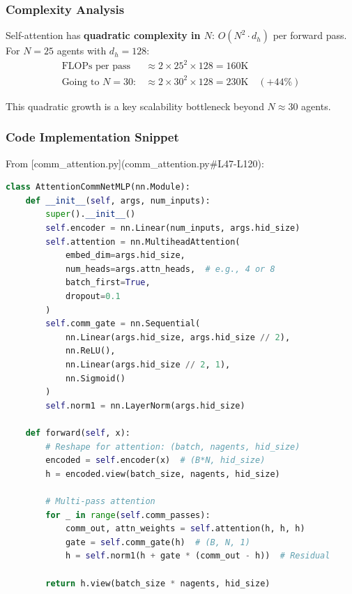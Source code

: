 \subsubsection{Complexity Analysis}

Self-attention has \textbf{quadratic complexity in $N$}: $O(N^2 \cdot d_h)$ per forward pass. For $N=25$ agents with $d_h=128$:
\begin{align*}
\text{FLOPs per pass} &\approx 2 \times 25^2 \times 128 = 160\text{K} \\
\text{Going to } N=30: &\approx 2 \times 30^2 \times 128 = 230\text{K} \quad (+44\%)
\end{align*}

This quadratic growth is a key scalability bottleneck beyond $N \approx 30$ agents.

\subsubsection{Code Implementation Snippet}

From [comm\_attention.py](comm_attention.py#L47-L120):

\begin{lstlisting}[language=Python, basicstyle=\small]
class AttentionCommNetMLP(nn.Module):
    def __init__(self, args, num_inputs):
        super().__init__()
        self.encoder = nn.Linear(num_inputs, args.hid_size)
        self.attention = nn.MultiheadAttention(
            embed_dim=args.hid_size,
            num_heads=args.attn_heads,  # e.g., 4 or 8
            batch_first=True,
            dropout=0.1
        )
        self.comm_gate = nn.Sequential(
            nn.Linear(args.hid_size, args.hid_size // 2),
            nn.ReLU(),
            nn.Linear(args.hid_size // 2, 1),
            nn.Sigmoid()
        )
        self.norm1 = nn.LayerNorm(args.hid_size)
    
    def forward(self, x):
        # Reshape for attention: (batch, nagents, hid_size)
        encoded = self.encoder(x)  # (B*N, hid_size)
        h = encoded.view(batch_size, nagents, hid_size)
        
        # Multi-pass attention
        for _ in range(self.comm_passes):
            comm_out, attn_weights = self.attention(h, h, h)
            gate = self.comm_gate(h)  # (B, N, 1)
            h = self.norm1(h + gate * (comm_out - h))  # Residual
        
        return h.view(batch_size * nagents, hid_size)
\end{lstlisting}


